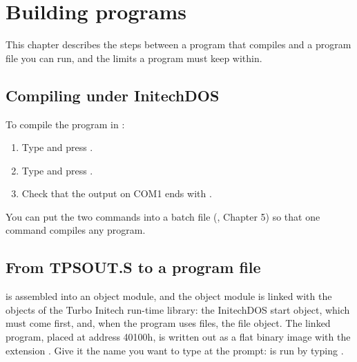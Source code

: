 \chapter{Building programs}

This chapter describes the steps between a program that compiles and a
program file you can run, and the limits a program must keep within.

\section{Compiling under InitechDOS}
To compile the program in :

\begin{enumerate}
\item Type  and press .
\item Type  and press .
\item Check that the output on COM1 ends with .
\end{enumerate}

You can put the two commands into a batch file (, Chapter 5) so that one command compiles any program.


\section{From TPSOUT.S to a program file}
 is assembled into an object module, and the object module
is linked with the objects of the Turbo Initech run-time library: the
InitechDOS start object, which must come first, and, when the program uses
files, the file object.  The
linked program, placed at address 40100h, is written out as a flat binary
image with the extension .  Give it the name you want to type at
the prompt:  is run by typing .


